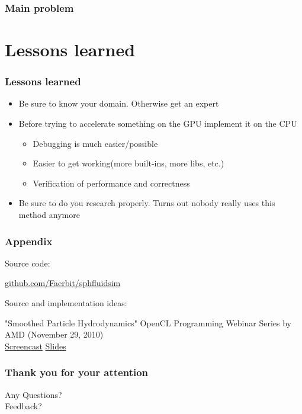 \documentclass{beamer}
\begin{document}
\begin{frame}
    \frametitle{Main problem}
    \begin{center}
    \end{center}
\end{frame}

\section{Lessons learned}
\begin{frame}
    \frametitle{Lessons learned}
    \begin{itemize}
        \item Be sure to know your domain. Otherwise get an expert
        \item Before trying to accelerate something on the GPU implement it on the CPU
            \begin{itemize}
                \item Debugging is much easier/possible
                \item Easier to get working(more built-ins, more libs, etc.)
                \item Verification of performance and correctness
            \end{itemize}
        \item Be sure to do you research properly. Turns out nobody really uses this method anymore
    \end{itemize}
\end{frame}

\begin{frame}
    \frametitle{Appendix}
    Source code:
    \begin{center}
        \href{https://github.com/Faerbit/sphfluidsim}{github.com/Faerbit/sphfluidsim}
    \end{center}
    Source and implementation ideas:
    \begin{center}
        "Smoothed Particle Hydrodynamics" OpenCL Programming Webinar Series by AMD (November 29, 2010)\\
        \href{https://youtu.be/SQPCXzqH610}{Screencast} \href{http://developer.amd.com/wordpress/media/2012/10/SmoothedParticleHydrodynamics.pdf}{Slides}
    \end{center}
\end{frame}

\begin{frame}
    \frametitle{Thank you for your attention}
    \begin{center}
        Any Questions?\\
        Feedback?
    \end{center}
    
\end{frame}
\end{document}
